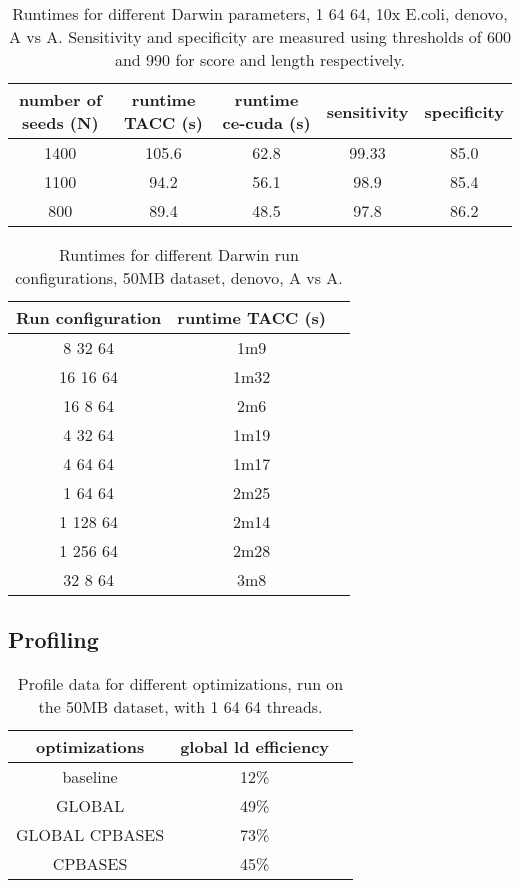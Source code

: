 \documentclass[../main/thesis.tex]{subfiles}
\begin{document}
\begin{table}
\centering
\caption{Runtimes for different Darwin parameters, 1 64 64, 10x E.coli, denovo, A vs A. Sensitivity and specificity are measured using thresholds of 600 and 990 for score and length respectively.}
\label{tbl:darwin4}
\begin{tabular}{c|cccc}
number of seeds (N) & runtime TACC (s) & runtime ce-cuda (s) & sensitivity & specificity \\ \hline
1400 & 105.6 & 62.8 & 99.33 & 85.0 \\
1100 & 94.2 & 56.1 & 98.9 & 85.4 \\
800 & 89.4 & 48.5 & 97.8 & 86.2 \\
\end{tabular}
\end{table}



\begin{table}
\centering
\caption{Runtimes for different Darwin run configurations, 50MB dataset, denovo, A vs A.}
\label{tbl:darwin6}
\begin{tabular}{c|cc}
Run configuration & runtime TACC (s) \\ \hline
 8 32 64 & 1m9 \\
16 16 64 & 1m32 \\
16  8 64 & 2m6 \\
 4 32 64 & 1m19 \\
 4 64 64 & 1m17 \\
 1 64 64 & 2m25 \\
1 128 64 & 2m14 \\
1 256 64 & 2m28 \\
 32 8 64 & 3m8 \\
\end{tabular}
\end{table}









\subsection{Profiling}

\begin{table}
\centering
\caption{Profile data for different optimizations, run on the 50MB dataset, with 1 64 64 threads.}
\label{tbl:darwin_prof}
\begin{tabular}{c c c}
optimizations & global ld efficiency \\ \hline
baseline & 12\% \\
GLOBAL & 49\% \\
GLOBAL CPBASES & 73\% \\
CPBASES & 45\% \\
\end{tabular}
\end{table}
\end{document}
